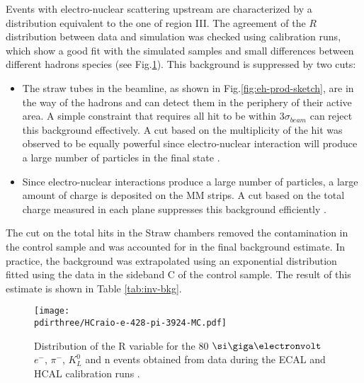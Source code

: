 Events with electro-nuclear scattering upstream are characterized by a distribution equivalent to the one of region III. The agreement of the $R$ distribution between data and simulation was checked using calibration runs, which show a good fit with the simulated samples and small differences between different hadrons species (see Fig.\ref{fig:R-comp}). This background is suppressed by two cuts:

\begin{itemize}
\item The straw tubes in the beamline, as shown in Fig.\ref{fig:eh-prod-sketch}, are in the way of the hadrons and can detect them in the periphery of their active area. A simple constraint that requires all hit to be within 3$\sigma_{beam}$ can reject this background effectively. A cut based on the multiplicity of the hit was observed to be equally powerful since electro-nuclear interaction will produce a large number of particles in the final state \cite{pdegen-thesis}.
\item Since electro-nuclear interactions produce a large number of particles, a large amount of charge is deposited on the MM strips. A cut based on the total charge measured in each plane suppresses this background efficiently \cite{na64-invisible-cuts}.
\end{itemize}

The cut on the total hits in the Straw chambers removed the contamination in the control sample and was accounted for in the final background estimate. In practice, the background was extrapolated using an exponential distribution fitted using the data in the sideband C of the control sample. The result of this estimate is shown in Table \ref{tab:inv-bkg}.

\begin{figure}[bht!]
  \centering
  \texttt{[image: \\pdirthree/HCraio-e-428-pi-3924-MC.pdf]}
  \caption[R value comparison]{Distribution of the R variable for the 80 $\gev$ $e^-$, $\pi^-$, $K_L^0$ and n events obtained from data during the ECAL and HCAL calibration runs \cite{Banerjee:2020fue}.}
  \label{fig:R-comp}
\end{figure}


